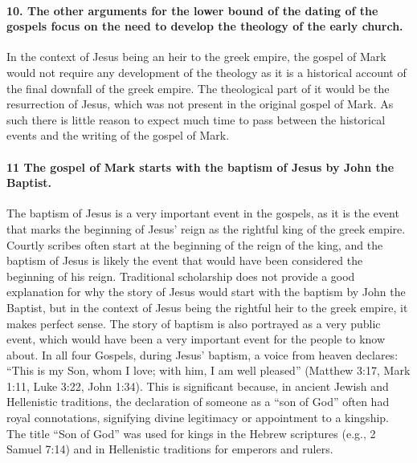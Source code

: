 \paragraph{10.
The other arguments for the lower bound of the dating of the gospels focus on the need to develop the theology of the early church.}\label{par:the-other-arguments-for-the-lower-bound-of-the-dating-of-the-gospels-focus-on-the-need-to-develop-the-theology-of-the-early-church.}

In the context of Jesus being an heir to the greek empire, the gospel of Mark would not require any development of the theology as it is a historical account of the final downfall of the greek empire.
The theological part of it would be the resurrection of Jesus, which was not present in the original gospel of Mark.
As such there is little reason to expect much time to pass between the historical events and the writing of the gospel of Mark.

\paragraph{11 The gospel of Mark starts with the baptism of Jesus by John the Baptist.}\label{par:the-gospel-of-mark-starts-with-the-baptism-of-jesus-by-john-the-baptist.}

The baptism of Jesus is a very important event in the gospels, as it is the event that marks the beginning of Jesus' reign as the rightful king of the greek empire.
Courtly scribes often start at the beginning of the reign of the king, and the baptism of Jesus is likely the event that would have been considered the beginning of his reign.
Traditional scholarship does not provide a good explanation for why the story of Jesus would start with the baptism by John the Baptist, but in the context of Jesus being the rightful heir to the greek empire, it makes perfect sense.
The story of baptism is also portrayed as a very public event, which would have been a very important event for the people to know about.
In all four Gospels, during Jesus' baptism, a voice from heaven declares: ``This is my Son, whom I love; with him, I am well pleased'' (Matthew 3:17, Mark 1:11, Luke 3:22, John 1:34).
This is significant because, in ancient Jewish and Hellenistic traditions, the declaration of someone as a ``son of God'' often had royal connotations, signifying divine legitimacy or appointment to a kingship.
The title ``Son of God'' was used for kings in the Hebrew scriptures (e.g., 2 Samuel 7:14) and in Hellenistic traditions for emperors and rulers.

